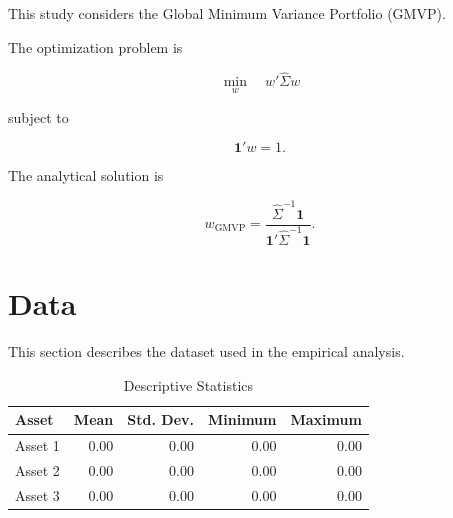 \documentclass[12pt,a4paper]{article}
\begin{document}
	This study considers the Global Minimum Variance Portfolio
	(GMVP).
	
	The optimization problem is
	
	\begin{equation}
		\min_{w}
		\quad
		w'\widehat{\Sigma}w
	\end{equation}
	
	subject to
	
	\begin{equation}
		\mathbf{1}'w = 1.
	\end{equation}
	
	The analytical solution is
	
	\begin{equation}
		w_{\mathrm{GMVP}}
		=
		\frac{
			\widehat{\Sigma}^{-1}\mathbf{1}
		}{
			\mathbf{1}'
			\widehat{\Sigma}^{-1}
			\mathbf{1}
		}.
	\end{equation}
	
	
	
	\section{Data}
	
	This section describes the dataset used in the empirical
	analysis.
	
	\begin{table}[htbp]
		
		\centering
		
		\caption{Descriptive Statistics}
		
		\begin{tabular}{lrrrr}
			
			\toprule
			
			Asset & Mean & Std. Dev. & Minimum & Maximum \\
			
			\midrule
			
			Asset 1 & 0.00 & 0.00 & 0.00 & 0.00\\
			Asset 2 & 0.00 & 0.00 & 0.00 & 0.00\\
			Asset 3 & 0.00 & 0.00 & 0.00 & 0.00\\
			
			\bottomrule
			
		\end{tabular}
		
	\end{table}
	
	
	
\end{document}
